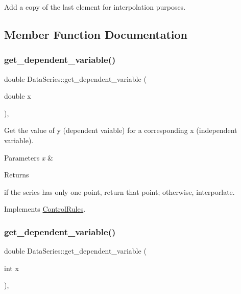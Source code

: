 Add a copy of the last element for interpolation purposes. 

\subsection{Member Function Documentation}
\mbox{\label{classDataSeries_a3cb684ebcbdd6d9969996f306bed8b53_a3cb684ebcbdd6d9969996f306bed8b53}} 
\subsubsection{\texorpdfstring{get\+\_\+dependent\+\_\+variable()}{get\_dependent\_variable()}\hspace{0.1cm}{\footnotesize\ttfamily [1/4]}}
{\footnotesize\ttfamily double Data\+Series\+::get\+\_\+dependent\+\_\+variable (\begin{DoxyParamCaption}\item[{double}]{x }\end{DoxyParamCaption})\hspace{0.3cm}{\ttfamily [override]}, {\ttfamily [virtual]}}

Get the value of y (dependent vaiable) for a corresponding x (independent variable). 
\begin{DoxyParams}{Parameters}
{\em x} & \\
\hline
\end{DoxyParams}
\begin{DoxyReturn}{Returns}

\end{DoxyReturn}
if the series has only one point, return that point; otherwise, interporlate. 

Implements \mbox{\hyperlink{classControlRules_a749c604121ebb1df808df9cd957a09f1_a749c604121ebb1df808df9cd957a09f1}{Control\+Rules}}.

\mbox{\label{classDataSeries_a57c3737304a489a3ae9cae5910fc5337_a57c3737304a489a3ae9cae5910fc5337}} 
\subsubsection{\texorpdfstring{get\+\_\+dependent\+\_\+variable()}{get\_dependent\_variable()}\hspace{0.1cm}{\footnotesize\ttfamily [2/4]}}
{\footnotesize\ttfamily double Data\+Series\+::get\+\_\+dependent\+\_\+variable (\begin{DoxyParamCaption}\item[{int}]{x }\end{DoxyParamCaption})\hspace{0.3cm}{\ttfamily [override]}, {\ttfamily [virtual]}}



